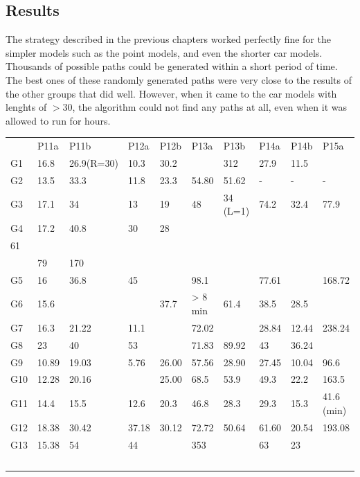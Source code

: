\documentclass[a4paper,12pt]{article}
\begin{document}
\subsection{Results}
The strategy described in the previous chapters worked perfectly fine for the simpler models such as the point models, and even the shorter car models.
Thousands of possible paths could be generated within a short period of time.
The best ones of these randomly generated paths were very close to the results of the other groups that did well.
However, when it came to the car models with lenghts of $ >30$, the algorithm could not find any paths at all, even when it was allowed to run for hours.

\begin{table}
    \begin{tabular}{llllllllll}
    ~   & P11a  & P11b       & P12a  & P12b  & P13a    & P13b     & P14a          & P14b  & P15a        \\
    G1  & 16.8  & 26.9(R=30) & 10.3  & 30.2  & ~       & 312      & 27.9          & 11.5  & ~           \\
    G2  & 13.5  & 33.3       & 11.8  & 23.3  & 54.80   & 51.62    & -             & -     & -           \\
    G3  & 17.1  & 34         & 13    & 19    & 48      & 34 (L=1) & 74.2          & 32.4  & 77.9        \\
    G4  & 17.2  & 40.8       & 30    & 28    & ~       & ~        & \\    61\\    & 79    & 170         \\
    G5  & 16    & 36.8       & 45    & ~     & 98.1    & ~        & 77.61         & ~     & 168.72      \\
    G6  & 15.6  & ~          & ~     & 37.7  & > 8 min & 61.4     & 38.5          & 28.5  & ~           \\
    G7  & 16.3  & 21.22      & 11.1  & ~     & 72.02   & ~        & 28.84         & 12.44 & 238.24      \\
    G8  & 23    & 40         & 53    & ~     & 71.83   & 89.92    & 43            & 36.24 & ~           \\
    G9  & 10.89 & 19.03      & 5.76  & 26.00 & 57.56   & 28.90    & 27.45         & 10.04 & 96.6        \\
    G10 & 12.28 & 20.16      & ~     & 25.00 & 68.5    & 53.9     & 49.3          & 22.2  & 163.5       \\
    G11 & 14.4  & 15.5       & 12.6  & 20.3  & 46.8    & 28.3     & 29.3          & 15.3  & 41.6 (min)  \\
    G12 & 18.38 & 30.42      & 37.18 & 30.12 & 72.72   & 50.64    & 61.60         & 20.54 & 193.08      \\
    G13 & 15.38 & 54         & 44    & ~     & 353     & ~        & 63            & 23    & ~           \\
    ~   & ~     & ~          & ~     & ~     & ~       & ~        & ~             & ~     & ~           \\
    \end{tabular}
\end{table}
\pagebreak
\end{document}
